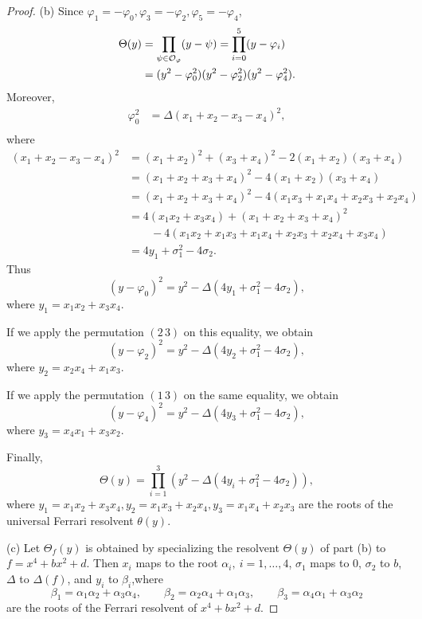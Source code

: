 \documentclass[11pt,a4paper]{article}
\begin{document}
\begin{proof}
\item[(b)] Since $\varphi_1 = -\varphi_0, \varphi_3 = -\varphi_2, \varphi_5 = - \varphi_4$,
\begin{align*}
\Theta(y) &= \prod_{\psi \in {\cal O}_\varphi} (y - \psi) = \prod_{i=0}^5 (y- \varphi_i)\\
&= (y^2- \varphi_0^2) (y^2- \varphi_2^2) (y^2 - \varphi_4^2).
\end{align*}
Moreover,
\begin{align*}
\varphi_0^2 &= \Delta(x_1+x_2-x_3-x_4)^2,\\
\end{align*}
where
\begin{align*}
(x_1+x_2-x_3-x_4)^2&= (x_1+x_2)^2 + (x_3 + x_4)^2 - 2(x_1+x_2)(x_3+x_4)\\
&=(x_1+x_2+x_3+x_4)^2 - 4(x_1+x_2)(x_3+x_4)\\
&=(x_1+x_2+x_3+x_4)^2 -4(x_1x_3 +x_1x_4 + x_2x_3+x_2x_4)\\
&= 4(x_1x_2 + x_3x_4) + (x_1+x_2+x_3+x_4)^2 \\
&\qquad - 4(x_1x_2+x_1x_3+x_1x_4+x_2x_3+x_2x_4+x_3x_4)\\
&= 4y_1 +\sigma_1^2 - 4 \sigma_2.
\end{align*}
Thus
$$(y-\varphi_0)^2 = y^2  -\Delta(4y_1 +\sigma_1^2 - 4 \sigma_2), $$
where $y_1 = x_1x_2+x_3x_4$.

If we apply the permutation $(2\,3)$ on this equality, we obtain
$$(y - \varphi_2)^2 = y^2 - \Delta (4y_2 + \sigma_1^2 - 4\sigma_2),$$
where $y_2 =  x_2x_4 + x_1x_3$.

If we apply the permutation $(1\,3)$ on the same equality, we obtain
$$(y - \varphi_4)^2 = y^2 - \Delta(4y_3 + \sigma_1^2 - 4 \sigma_2),$$
where $y_3= x_4x_1 + x_3 x_2   $. 

Finally,
$$\Theta(y) = \prod_{i=1}^3 \left(y^2 - \Delta(4y_i+\sigma_1^2 - 4 \sigma_2)\right),$$
where $y_1 = x_1x_2+x_3x_4, y_2 = x_1x_3 +x_2x_4,y_3 = x_1x_4+x_2x_3$ are the roots of the universal Ferrari resolvent $\theta(y)$.

\item[(c)]
Let $\Theta_f(y)$ is obtained by specializing the resolvent $\Theta(y)$ of part (b) to ${f = x^4+bx^2 + d}$. 
Then $x_i$ maps to the root $\alpha_i,\ i= 1,\ldots,4$, $\sigma_1$ maps to $0$, $\sigma_2$ to $b$, $\Delta$ to $\Delta(f)$, and $y_i$ to $\beta_i$,where 
$$\beta_1 = \alpha_1 \alpha_2 + \alpha_3\alpha_4,\qquad  \beta_2 = \alpha_2 \alpha_4 + \alpha_1 \alpha_3,\qquad \beta_3 = \alpha_4 \alpha_1 + \alpha_3\alpha_2$$
are the roots of the Ferrari resolvent of $x^4 + bx^2 +d$.


\end{proof}
\end{document}

